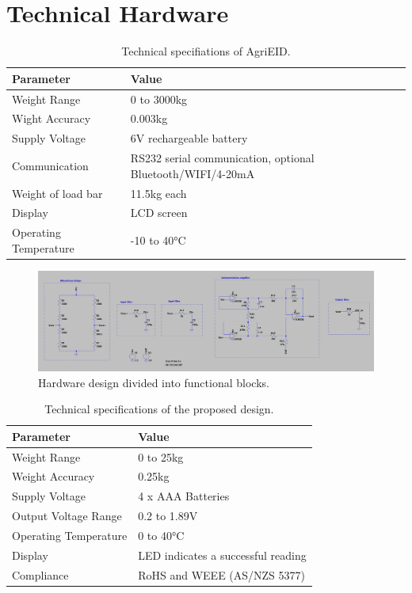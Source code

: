 \chapter{Technical Hardware}

\begin{table}[h]
\centering
\begin{tabular}{|l|m{6cm}|}
    \hline
    Parameter & Value \\
    \hline
    Weight Range & 0 to 3000kg \\
    Wight Accuracy & 0.003kg \\
    Supply Voltage & 6V rechargeable battery \\
    Communication &	RS232 serial communication, optional Bluetooth/WIFI/4-20mA \\
    Weight of load bar	& 11.5kg each \\
    Display & LCD screen \\
    Operating Temperature & -10 to 40°C \\
    \hline
\end{tabular}
\caption{Technical specifiations of AgriEID.}
\label{table:tech specs AgriEID}
\end{table}

\begin{figure}[h]
    \centering
    \includegraphics[width=\textwidth]{proposal/parts/hardware-circuit.png}
    \caption{Hardware design divided into functional blocks.}
    \label{fig:hardware}
\end{figure}


\begin{table}[h]
\begin{center}
\begin{tabular}{|l|l|}
    \hline
    Parameter & Value \\
    \hline
    Weight Range & 0 to 25kg \\
    Weight Accuracy & 0.25kg \\
    Supply Voltage & 4 x AAA Batteries \\
    Output Voltage Range & 0.2 to 1.89V \\
    Operating Temperature & 0 to 40°C \\
    Display & LED indicates a successful reading \\
    Compliance & RoHS and WEEE (AS/NZS 5377) \\
    \hline
\end{tabular}
\caption{Technical specifications of the proposed design.}
\label{table:tech specs}
\end{center}
\end{table}

